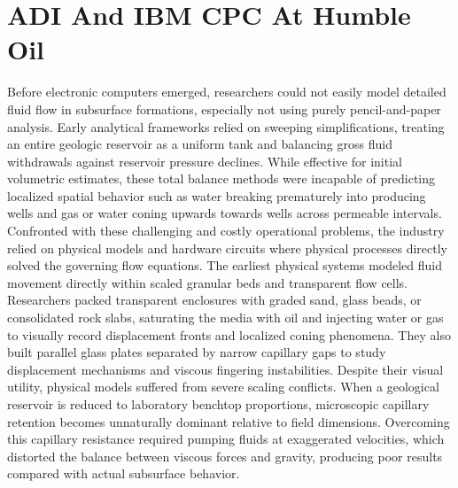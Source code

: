 \section{ADI And IBM CPC At Humble Oil}

Before electronic computers emerged, researchers could not easily model detailed fluid flow in subsurface formations, especially not using purely pencil-and-paper analysis. Early analytical frameworks relied on sweeping simplifications, treating an entire geologic reservoir as a uniform tank and balancing gross fluid withdrawals against reservoir pressure declines. While effective for initial volumetric estimates, these total balance methods were incapable of predicting localized spatial behavior such as water breaking prematurely into producing wells and gas or water coning upwards towards wells across permeable intervals. Confronted with these challenging and costly operational problems, the industry relied on physical models and hardware circuits where physical processes directly solved the governing flow equations. The earliest physical systems modeled fluid movement directly within scaled granular beds and transparent flow cells. Researchers packed transparent enclosures with graded sand, glass beads, or consolidated rock slabs, saturating the media with oil and injecting water or gas to visually record displacement fronts and localized coning phenomena. They also built parallel glass plates separated by narrow capillary gaps to study displacement mechanisms and viscous fingering instabilities. Despite their visual utility, physical models suffered from severe scaling conflicts. When a geological reservoir is reduced to laboratory benchtop proportions, microscopic capillary retention becomes unnaturally dominant relative to field dimensions. Overcoming this capillary resistance required pumping fluids at exaggerated velocities, which distorted the balance between viscous forces and gravity, producing poor results compared with actual subsurface behavior. \cite{wyckoffMechanicsPorousFlow1933}

